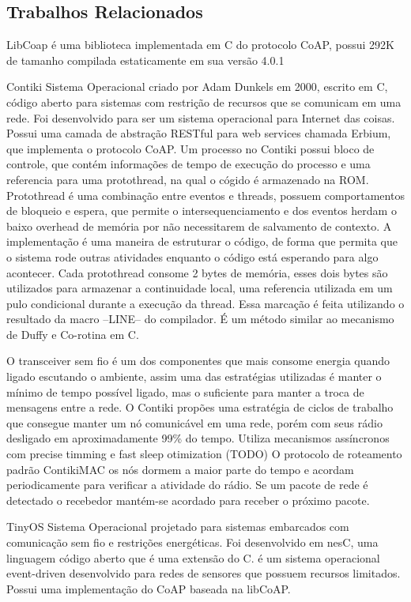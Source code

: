 \subsection{Trabalhos Relacionados}

LibCoap \'e uma biblioteca implementada em C do protocolo CoAP, possui 292K de tamanho compilada estaticamente em sua vers\~ao 4.0.1

Contiki Sistema Operacional criado por Adam Dunkels em 2000, escrito em C, c\'odigo aberto para sistemas com restri\c{c}\~ao de recursos que se comunicam em uma rede. Foi desenvolvido para ser um sistema operacional para Internet das coisas. Possui uma camada de abstra\c{c}\~ao RESTful para web services chamada Erbium, que implementa o protocolo CoAP. Um processo no Contiki possui bloco de controle, que contém informa\c{c}\~oes de tempo de execu\c{c}\~ao do processo e uma referencia para uma protothread, na qual o c\'ogido \'e armazenado na ROM.
Protothread é uma combina\c{c}\~ao entre eventos e threads, possuem comportamentos de bloqueio e espera, que permite o intersequenciamento e dos eventos herdam o baixo overhead de mem\'oria por n\~ao necessitarem de salvamento de contexto. A implementação \'e uma maneira de estruturar o c\'odigo, de forma que permita que o sistema rode outras atividades enquanto o c\'odigo est\'a esperando para algo acontecer. Cada protothread consome 2 bytes de mem\'oria, esses dois bytes s\~ao utilizados para armazenar a continuidade local, uma referencia utilizada em um pulo condicional durante a execu\c{c}\~ao da thread. Essa marca\c{c}\~ao \'e feita utilizando o resultado da macro --LINE-- do compilador. \'E um método similar ao mecanismo de Duffy e Co-rotina em C. \cite{duffy}

O transceiver sem fio \'e um dos componentes que mais consome energia quando ligado escutando o ambiente, assim uma das estratégias utilizadas é manter o m\'inimo de tempo poss\'ivel ligado, mas o suficiente para manter a troca de mensagens entre a rede. O Contiki prop\~oes uma estrat\'egia de ciclos de trabalho que consegue manter um n\'o comunic\'avel em uma rede, por\'em com seus r\'adio desligado em aproximadamente 99\% do tempo. Utiliza mecanismos ass\'incronos com precise timming e fast sleep otimization (TODO)
O protocolo de roteamento padr\~ao ContikiMAC os n\'os dormem a maior parte do tempo e acordam periodicamente para verificar a atividade do r\'adio. Se um pacote de rede \'e detectado o recebedor mant\'em-se acordado para receber o pr\'oximo pacote.

TinyOS Sistema Operacional projetado para sistemas embarcados com comunica\c{c}\~ao sem fio e restri\c{c}\~oes energ\'eticas. Foi desenvolvido em nesC, uma linguagem c\'odigo aberto que \'e uma extens\~ao do C. \'e um sistema operacional event-driven desenvolvido para redes de sensores que possuem recursos limitados. Possui uma implementa\c{c}\~ao do CoAP baseada na libCoAP.

